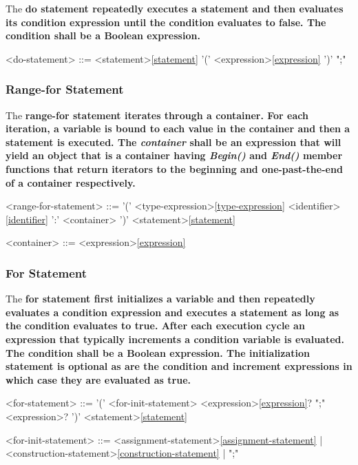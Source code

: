 \documentclass[a4paper,oneside,11pt]{article}
\begin{document}
The \bf{do} statement repeatedly executes a statement and then evaluates its condition expression until the condition evaluates to \bf{false}.
The condition shall be a Boolean expression.

\begin{grammar}
\label{do-statement}<do-statement> ::=  <statement>\ref{statement}  '(' <expression>\ref{expression} ')' ";"
\end{grammar}

\subsubsection{Range-for Statement}
The \bf{range-for} statement iterates through a container.
For each iteration, a variable is bound to each value in the container and then a statement is executed.
The \emph{container} shall be an expression that will yield an object that is a container having \emph{Begin()} and \emph{End()} member functions
that return iterators to the beginning and one-past-the-end of a container respectively.

\begin{grammar}
\label{range-for-statement}<range-for-statement> ::=  '(' <type-expression>\ref{type-expression} <identifier>\ref{identifier} ':' <container> ')' <statement>\ref{statement}

<container> ::= <expression>\ref{expression}
\end{grammar}

\subsubsection{For Statement}

The \bf{for} statement first initializes a variable and then
repeatedly evaluates a condition expression and executes a statement as long as the condition evaluates to \bf{true}.
After each execution cycle an expression that typically increments a condition variable is evaluated.
The condition shall be a Boolean expression.
The initialization statement is optional as are the condition and increment expressions in which case they are evaluated as \bf{true}.

\begin{grammar}
\label{for-statement}<for-statement> ::=  '(' <for-init-statement> <expression>\ref{expression}? ";" <expression>? ')' <statement>\ref{statement}

<for-init-statement> ::= <assignment-statement>\ref{assignment-statement} | <construction-statement>\ref{construction-statement} | ";"
\end{grammar}
\end{document}
